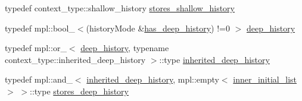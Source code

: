 \begin{DoxyCompactItemize}
\item 
typedef context\+\_\+type\+::shallow\+\_\+history \mbox{\hyperlink{classboost_1_1statechart_1_1simple__state_a0e837dc75eff343ab64337979fc7eca4}{stores\+\_\+shallow\+\_\+history}}
\item 
typedef mpl\+::bool\+\_\+$<$(history\+Mode \&\mbox{\hyperlink{namespaceboost_1_1statechart_a9c4ec64d7a0422b8b9c97b489f731372aac03603fa90405ad5de45cc858477c7d}{has\+\_\+deep\+\_\+history}}) !=0 $>$ \mbox{\hyperlink{classboost_1_1statechart_1_1simple__state_a2e6aa9f4912c70a9dbef800845044bc7}{deep\+\_\+history}}
\item 
typedef mpl\+::or\+\_\+$<$ \mbox{\hyperlink{classboost_1_1statechart_1_1simple__state_a2e6aa9f4912c70a9dbef800845044bc7}{deep\+\_\+history}}, typename context\+\_\+type\+::inherited\+\_\+deep\+\_\+history $>$\+::type \mbox{\hyperlink{classboost_1_1statechart_1_1simple__state_a0a3f8d8bb00bdd1769113111b2e2fae7}{inherited\+\_\+deep\+\_\+history}}
\item 
typedef mpl\+::and\+\_\+$<$ \mbox{\hyperlink{classboost_1_1statechart_1_1simple__state_a0a3f8d8bb00bdd1769113111b2e2fae7}{inherited\+\_\+deep\+\_\+history}}, mpl\+::empty$<$ \mbox{\hyperlink{classboost_1_1statechart_1_1simple__state_ae86cab19f07d10cd8e46937fd243d4ba}{inner\+\_\+initial\+\_\+list}} $>$ $>$\+::type \mbox{\hyperlink{classboost_1_1statechart_1_1simple__state_ab912b321d44a14521b3c80e11fb919e1}{stores\+\_\+deep\+\_\+history}}
\end{DoxyCompactItemize}
